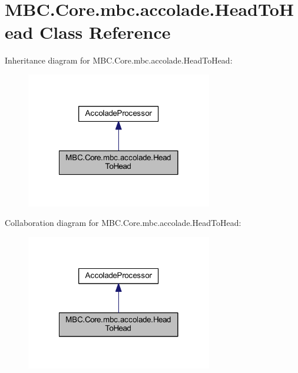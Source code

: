\hypertarget{class_m_b_c_1_1_core_1_1mbc_1_1accolade_1_1_head_to_head}{\section{M\-B\-C.\-Core.\-mbc.\-accolade.\-Head\-To\-Head Class Reference}
\label{class_m_b_c_1_1_core_1_1mbc_1_1accolade_1_1_head_to_head}
}


Inheritance diagram for M\-B\-C.\-Core.\-mbc.\-accolade.\-Head\-To\-Head\-:\nopagebreak
\begin{figure}[H]
\begin{center}
\leavevmode
\includegraphics[width=230pt]{class_m_b_c_1_1_core_1_1mbc_1_1accolade_1_1_head_to_head__inherit__graph}
\end{center}
\end{figure}


Collaboration diagram for M\-B\-C.\-Core.\-mbc.\-accolade.\-Head\-To\-Head\-:\nopagebreak
\begin{figure}[H]
\begin{center}
\leavevmode
\includegraphics[width=230pt]{class_m_b_c_1_1_core_1_1mbc_1_1accolade_1_1_head_to_head__coll__graph}
\end{center}
\end{figure}
